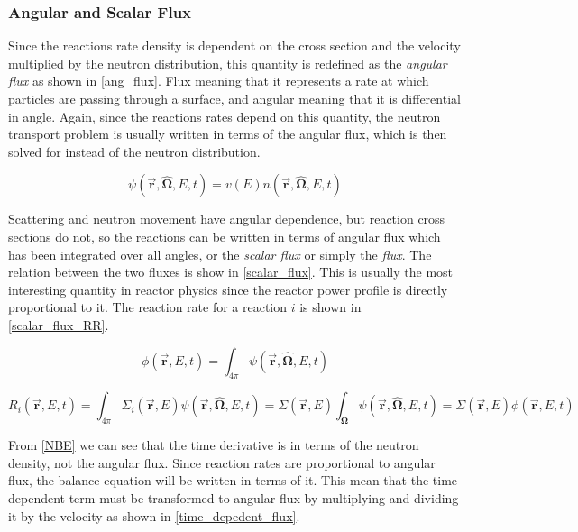 \subsubsection{Angular and Scalar Flux}

Since the reactions rate density is dependent on the cross section and the velocity multiplied by the neutron distribution, this quantity is redefined as the \emph{angular flux} as shown in \eqref{ang_flux}.  Flux meaning that it represents a rate at which particles are passing through a surface, and angular meaning that it is differential in angle.  Again, since the reactions rates depend on this quantity, the neutron transport problem is usually written in terms of the angular flux, which is then solved for instead of the neutron distribution.

\begin{equation}
\label{ang_flux}
\psi(\boldsymbol{\vec{r}},\boldsymbol{\hat{\Omega}},E,t) = v(E) n(\boldsymbol{\vec{r}},\boldsymbol{\hat{\Omega}},E,t)
\end{equation}

Scattering and neutron movement have angular dependence, but reaction cross sections do not, so the reactions can be written in terms of angular flux which has been integrated over all angles, or the \emph{scalar flux} or simply the \emph{flux}.  The relation between the two fluxes is show in \eqref{scalar_flux}.  This is usually the most interesting quantity in reactor physics since the reactor power profile is directly proportional to it.  The reaction rate for a reaction $i$ is shown in \eqref{scalar_flux_RR}.

\begin{equation}
\label{scalar_flux}
\phi(\boldsymbol{\vec{r}},E,t) = \int_{4\pi} \psi(\boldsymbol{\vec{r}},\boldsymbol{\hat{\Omega}},E,t)
\end{equation}

\begin{equation}
\label{scalar_flux_RR}
 R_i(\boldsymbol{\vec{r}},E,t) = \int_{4\pi} \Sigma_i(\boldsymbol{\vec{r}},E) \psi(\boldsymbol{\vec{r}},\boldsymbol{\hat{\Omega}},E,t) = \Sigma(\boldsymbol{\vec{r}},E) \int_{\boldsymbol{\Omega}} \psi(\boldsymbol{\vec{r}},\boldsymbol{\hat{\Omega}},E,t) = \Sigma(\boldsymbol{\vec{r}},E) \phi(\boldsymbol{\vec{r}},E,t)
 \end{equation}
 
 From \eqref{NBE} we can see that the time derivative is in terms of the neutron density, not the angular flux.  Since reaction rates are proportional to angular flux, the balance equation will be written in terms of it.  This mean that the time dependent term must be transformed to angular flux by multiplying and dividing it by the velocity as shown in \eqref{time_depedent_flux}.

